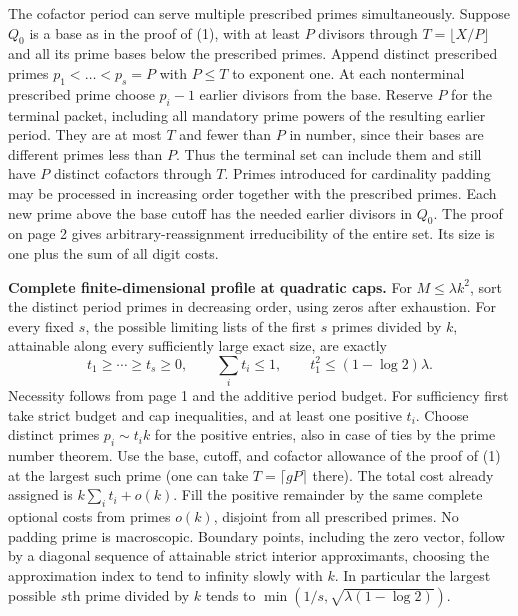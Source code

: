 \newpage
{}
The cofactor period can serve multiple prescribed primes simultaneously. Suppose $Q_0$ is a base as in the proof of (1), with at least $P$ divisors through $T=\lfloor X/P\rfloor$ and all its prime bases below the prescribed primes. Append distinct prescribed primes $p_1<\dots<p_s=P$ with $P\le T$ to exponent one. At each nonterminal prescribed prime choose $p_i-1$ earlier divisors from the base. Reserve $P$ for the terminal packet, including all mandatory prime powers of the resulting earlier period. They are at most $T$ and fewer than $P$ in number, since their bases are different primes less than $P$. Thus the terminal set can include them and still have $P$ distinct cofactors through $T$. Primes introduced for cardinality padding may be processed in increasing order together with the prescribed primes. Each new prime above the base cutoff has the needed earlier divisors in $Q_0$. The proof on page 2 gives arbitrary-reassignment irreducibility of the entire set. Its size is one plus the sum of all digit costs.

\textbf{Complete finite-dimensional profile at quadratic caps.} For $M\le\lambda k^2$, sort the distinct period primes in decreasing order, using zeros after exhaustion. For every fixed $s$, the possible limiting lists of the first $s$ primes divided by $k$, attainable along every sufficiently large exact size, are exactly
\[
 t_1\ge\cdots\ge t_s\ge0,\qquad
 \sum_i t_i\le1,\qquad t_1^2\le(1-\log2)\lambda .
\]
Necessity follows from page 1 and the additive period budget. For sufficiency first take strict budget and cap inequalities, and at least one positive $t_i$. Choose distinct primes $p_i\sim t_i k$ for the positive entries, also in case of ties by the prime number theorem. Use the base, cutoff, and cofactor allowance of the proof of (1) at the largest such prime (one can take $T=\lceil gP\rceil$ there). The total cost already assigned is $k\sum_i t_i+o(k)$. Fill the positive remainder by the same complete optional costs from primes $o(k)$, disjoint from all prescribed primes. No padding prime is macroscopic. Boundary points, including the zero vector, follow by a diagonal sequence of attainable strict interior approximants, choosing the approximation index to tend to infinity slowly with $k$. In particular the largest possible $s$th prime divided by $k$ tends to $\min(1/s,\sqrt{\lambda(1-\log2)})$.

